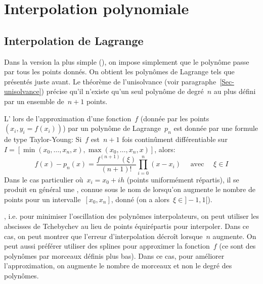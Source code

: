 \medskip
\section{Interpolation polynomiale} 

\medskip
\subsection{Interpolation de Lagrange} 

Dans la version la plus simple (), on impose simplement que le polynôme passe par tous les points donnés. On obtient les polynômes de Lagrange tels que présentés juste avant.  Le théorème de l'unisolvance (voir paragraphe~\ref{Sec-unisolvance}) précise qu'il n'existe qu'un seul polynôme de degré~$n$ au plus défini par un ensemble de~$n+1$ points. 

L' lors de l'approximation d'une fonction~$f$ (donnée par les points~$(x_i,y_i=f(x_i))$) par un polynôme de Lagrange~$p_n$ est donnée par une formule de type Taylor-Young: Si~$f$ est~$n+1$ fois continûment différentiable sur~$I=[\min(x_0,\ldots,x_n,x),\max(x_0,\ldots,x_n,x)]$, alors:
\begin{equation}
f(x) - p_n(x) = \frac{f^{(n+1)}(\xi)}{(n+1)!} \prod_{i=0}^n (x-x_i) \quad \text{ avec }\quad \xi \in I
\end{equation}
Dans le cas particulier où~$x_i = x_0 + ih$ (points uniformément répartis), il se produit en général une , connue sous le nom de  lorsqu'on augmente le nombre de points pour un intervalle~$[x_0,x_n]$, donné (on a alors~$\xi\in]-1,1[$). 

, i.e. pour minimiser l'oscillation des polynômes interpolateurs, on peut utiliser les abscisses de Tchebychev au lieu de points équirépartis pour interpoler. Dans ce cas, on peut montrer que l'erreur d'interpolation décroît lorsque~$n$ augmente. On peut aussi préférer utiliser des splines pour approximer la fonction~$f$ (ce sont des polynômes par morceaux définis plus bas). Dans ce cas, pour améliorer l'approximation, on augmente le nombre de morceaux et non le degré des polynômes. 
 
